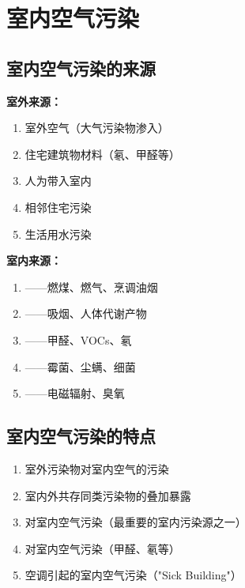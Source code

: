 \documentclass[10pt,a4paper,oneside]{ctexbook}
\begin{document}
\section{室内空气污染}

\subsection{室内空气污染的来源}

\begin{keybox}
\textbf{室外来源：}
\begin{enumerate}[leftmargin=*]
    \item 室外空气（大气污染物渗入）
    \item 住宅建筑物材料（氡、甲醛等）
    \item 人为带入室内
    \item 相邻住宅污染
    \item 生活用水污染
\end{enumerate}

\textbf{室内来源：}
\begin{enumerate}[leftmargin=*]
    \item {}——燃煤、燃气、烹调油烟
    \item {}——吸烟、人体代谢产物
    \item {}——甲醛、VOCs、氡
    \item {}——霉菌、尘螨、细菌
    \item {}——电磁辐射、臭氧
\end{enumerate}
\end{keybox}

\subsection{室内空气污染的特点}

\begin{enumerate}[leftmargin=*]
    \item 室外污染物对室内空气的污染
    \item 室内外共存同类污染物的叠加暴露
    \item {}对室内空气污染（最重要的室内污染源之一）
    \item {}对室内空气污染（甲醛、氡等）
    \item 空调引起的室内空气污染（"Sick Building"）
\end{enumerate}
\end{document}
